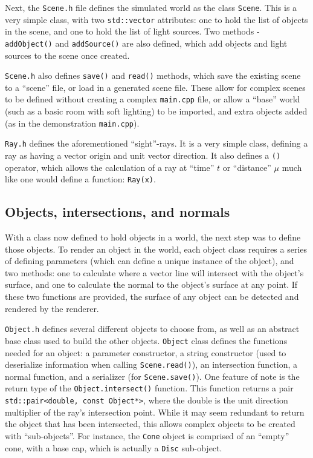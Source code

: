 \documentclass[a4paper]{article}
\begin{document}
Next, the \verb|Scene.h| file defines the simulated world as the class \verb|Scene|. This is a very simple class, with two \verb|std::vector| attributes: one to hold the list of objects in the scene, and one to hold the list of light sources. Two methods - \verb|addObject()| and \verb|addSource()| are also defined, which add objects and light sources to the scene once created.

\verb|Scene.h| also defines \verb|save()| and \verb|read()| methods, which save the existing scene to a ``scene'' file, or load in a generated scene file. These allow for complex scenes to be defined without creating a complex \verb|main.cpp| file, or allow a ``base'' world (such as a basic room with soft lighting) to be imported, and extra objects added (as in the demonstration \verb|main.cpp|).

\verb|Ray.h| defines the aforementioned ``sight''-rays. It is a very simple class, defining a ray as having a vector origin and unit vector direction. It also defines a \verb|()| operator, which allows the calculation of a ray at ``time'' $t$ or ``distance'' $\mu$ much like one would define a function: \verb|Ray(x)|.

\subsection{Objects, intersections, and normals}
With a class now defined to hold objects in a world, the next step was to define those objects. To render an object in the world, each object class requires a series of defining parameters (which can define a unique instance of the object), and two methods: one to calculate where a vector line will intersect with the object's surface, and one to calculate the normal to the object's surface at any point. If these two functions are provided, the surface of any object can be detected and rendered by the renderer.

\verb|Object.h| defines several different objects to choose from, as well as an abstract base class used to build the other objects. \verb|Object| class defines the functions needed for an object: a parameter constructor, a string constructor (used to deserialize information when calling \verb|Scene.read()|), an intersection function, a normal function, and a serializer (for \verb|Scene.save()|). One feature of note is the return type of the \verb|Object.intersect()| function. This function returns a pair \verb|std::pair<double, const Object*>|, where the double is the unit direction multiplier of the ray's intersection point. While it may seem redundant to return the object that has been intersected, this allows complex objects to be created with ``sub-objects''. For instance, the \verb|Cone| object is comprised of an ``empty'' cone, with a base cap, which is actually a \verb|Disc| sub-object.
\end{document}
